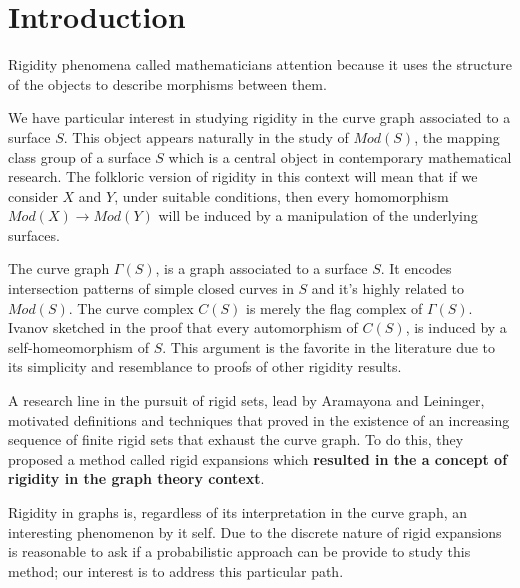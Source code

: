 \chapter*{Introduction} %

\label{Intro} %



Rigidity phenomena called mathematicians attention because it uses the structure of the objects to describe morphisms between them. 

We have particular interest in studying rigidity in the curve graph associated to a surface $S$. This object appears naturally in the study of $Mod(S)$, the mapping class group of a surface $S$ which is a central object in contemporary mathematical research. The folkloric version of rigidity in this context will mean that if we consider $X$ and $Y$, under suitable conditions, then every homomorphism $Mod(X) \to Mod(Y)$ will be induced by a manipulation of the underlying surfaces.

The curve graph $\Gamma(S)$, is a graph associated to a surface $S$. It encodes intersection patterns of simple closed curves in $S$ and it's highly related to $Mod(S)$. The curve complex $C(S)$ is merely the flag complex of $\Gamma(S)$. Ivanov sketched in \cite[Ivanov, 1997]{metaconjecture} the proof that every automorphism of $C(S)$, is induced by a self-homeomorphism of $S$. This argument is the favorite in the literature due to its simplicity and resemblance to proofs of other rigidity results.

A research line in the pursuit of rigid sets, lead by Aramayona and Leininger, motivated definitions and techniques that proved in \cite[Aramayona, Leininger - 16]{exhaustionByRigidSets} the existence of an increasing sequence of finite rigid sets that exhaust the curve graph. To do this, they proposed a method called rigid expansions which \textbf{resulted in the a concept of rigidity in the graph theory context}.

Rigidity in graphs is, regardless of its interpretation in the curve graph, an interesting phenomenon by it self. Due to the discrete nature of rigid expansions is reasonable to ask if a probabilistic approach can be provide to study this method; our interest is to address this particular path.

